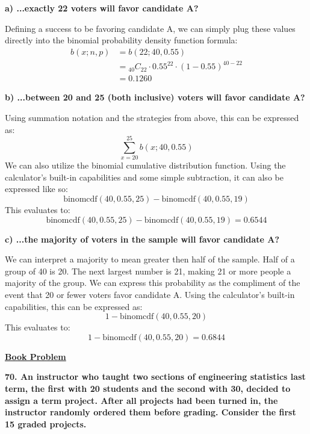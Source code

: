\documentclass[12pt, letter]{article}
\begin{document}
\qquad \textbf{a) ...exactly 22 voters will favor candidate A?}
\begin{center}
	Defining a success to be favoring candidate A, we can simply plug these values directly into the binomial probability density function formula:
	\begin{align*}
		b(x;n,p) &= b(22;40,0.55) \\
		&= {}_{40}C_{22} \cdot 0.55^{22} \cdot (1-0.55)^{40-22} \\
		&= \boxed{0.1260}
	\end{align*}
\end{center}

\pagebreak

\qquad \textbf{b) ...between 20 and 25 (both inclusive) voters will favor candidate A?}
\begin{center}
	Using summation notation and the strategies from above, this can be expressed as:
	$$\sum_{x=20}^{25} b(x;40,0.55)$$
	We can also utilize the binomial cumulative distribution function. Using the calculator's built-in capabilities and some simple subtraction, it can also be expressed like so:
	$$\text{binomcdf}(40,0.55,25) - \text{binomcdf}(40,0.55,19)$$
	This evaluates to:
	$$\text{binomcdf}(40,0.55,25) - \text{binomcdf}(40,0.55,19) = \boxed{0.6544}$$
\end{center}

\qquad \textbf{c) ...the majority of voters in the sample will favor candidate A?}
\begin{center}
	We can interpret a majority to mean greater then half of the sample. Half of a group of 40 is 20. The next largest number is 21, making 21 or more people a majority of the group. We can express this probability as the compliment of the event that 20 or fewer voters favor candidate A. Using the calculator's built-in capabilities, this can be expressed as:
	$$1 - \text{binomcdf}(40,0.55,20)$$
	This evaluates to:
	$$1 - \text{binomcdf}(40,0.55,20) = \boxed{0.6844}$$
\end{center}

\begin{center}
	\underline{\textbf{Book Problem}}
\end{center}

\textbf{70. An instructor who taught two sections of engineering statistics last term, the first with 20 students and the second with 30, decided to assign a term project. After all projects had been turned in, the instructor randomly ordered them before grading. Consider the first 15 graded projects.}
\end{document}
